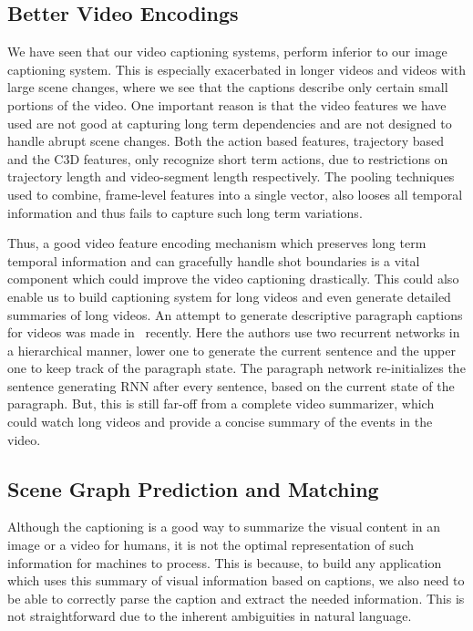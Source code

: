 \subsection{Better Video Encodings}
We have seen that our video captioning systems, perform inferior to our image
captioning system.
This is especially exacerbated in longer videos and videos with large scene
changes, where we see that the captions describe only certain small portions of
the video.
One important reason is that the video features we have used are not good at
capturing long term dependencies and are not designed to handle abrupt scene
changes.
Both the action based features, trajectory based and the C3D features, only
recognize short term actions, due to restrictions on trajectory length and
video-segment length respectively.
The pooling techniques used to combine, frame-level features into a single
vector, also looses all temporal information and thus fails to capture such long
term variations.

Thus, a good video feature encoding mechanism which preserves long term temporal
information and can gracefully handle shot boundaries is a vital component which
could improve the video captioning drastically.
This could also enable us to build captioning system for long videos and even
generate detailed summaries of long videos.
An attempt to generate descriptive paragraph captions for videos was made 
in~\cite{yu2015video} recently.
Here the authors use two recurrent networks in a hierarchical manner, lower one
to generate the current sentence and the upper one to keep track of the
paragraph state.
The paragraph network re-initializes the sentence generating RNN after every
sentence, based on the current state of the paragraph.
But, this is still far-off from a complete video summarizer, which could watch
long videos and provide a concise summary of the events in the video.
\subsection{Scene Graph Prediction and Matching}
Although the captioning is a good way to summarize the visual content in an
image or a video for humans, it is not the optimal representation of such
information for machines to process.
This is because, to build any application which uses this summary of visual
information based on captions, we also need to be able to correctly parse the
caption and extract the needed information.
This is not straightforward due to the inherent ambiguities in natural language.


